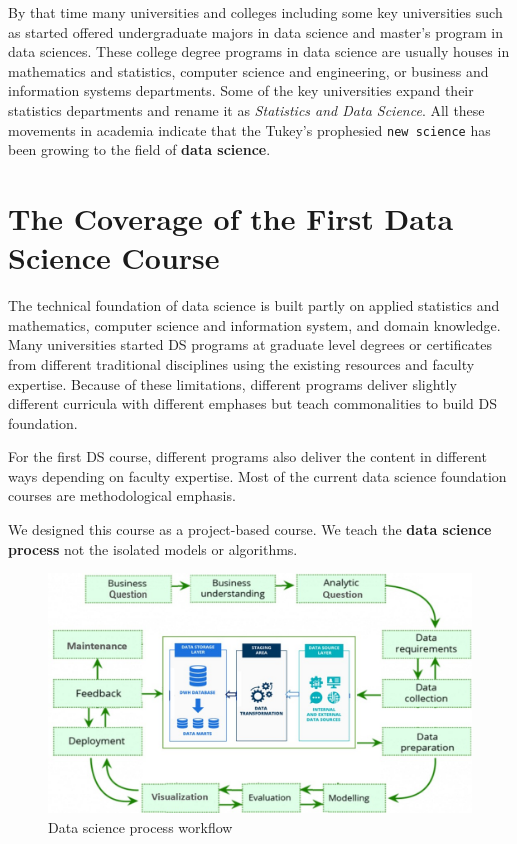 \documentclass[
]{book}
\begin{document}
By that time many universities and colleges including some key universities such as started offered undergraduate majors in data science and master's program in data sciences. These college degree programs in data science are usually houses in mathematics and statistics, computer science and engineering, or business and information systems departments. Some of the key universities expand their statistics departments and rename it as \emph{Statistics and Data Science}. All these movements in academia indicate that the Tukey's prophesied \texttt{new\ science} has been growing to the field of \textbf{data science}.

\hypertarget{the-coverage-of-the-first-data-science-course}{%
\section{The Coverage of the First Data Science Course}\label{the-coverage-of-the-first-data-science-course}}

The technical foundation of data science is built partly on applied statistics and mathematics, computer science and information system, and domain knowledge. Many universities started DS programs at graduate level degrees or certificates from different traditional disciplines using the existing resources and faculty expertise. Because of these limitations, different programs deliver slightly different curricula with different emphases but teach commonalities to build DS foundation.

For the first DS course, different programs also deliver the content in different ways depending on faculty expertise. Most of the current data science foundation courses are methodological emphasis.

We designed this course as a project-based course. We teach the \textbf{data science process} not the isolated models or algorithms.

\begin{figure}

{\centering \includegraphics[width=0.9\linewidth]{img01/w01-DSProcess} 

}

\caption{Data science process workflow}\label{fig:unnamed-chunk-3}
\end{figure}
\end{document}
